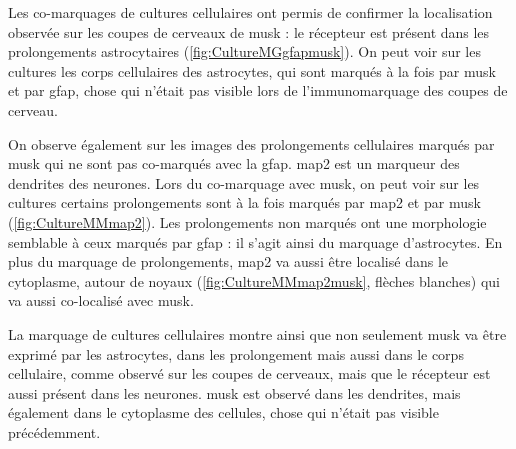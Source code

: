 	Les co-marquages de cultures cellulaires ont permis de confirmer la localisation observée sur les coupes de cerveaux de \gls{musk} : le récepteur est présent dans les prolongements astrocytaires (\cref{fig:CultureMGgfapmusk}). On peut voir sur les cultures les corps cellulaires des astrocytes, qui sont marqués à la fois par \gls{musk} et par \gls{gfap}, chose qui n'était pas visible lors de l'immunomarquage des coupes de cerveau.
	
	On observe également sur les images des prolongements cellulaires marqués par \gls{musk} qui ne sont pas co-marqués avec la \gls{gfap}. \gls{map2} est un marqueur des dendrites des neurones. Lors du co-marquage avec \gls{musk}, on peut voir sur les cultures certains prolongements sont à la fois marqués par \gls{map2} et par \gls{musk} (\cref{fig:CultureMMmap2}). Les prolongements non marqués ont une morphologie semblable à ceux marqués par \gls{gfap} : il s'agit ainsi du marquage d'astrocytes. En plus du marquage de prolongements, \gls{map2} va aussi être localisé dans le cytoplasme, autour de noyaux (\cref{fig:CultureMMmap2musk}, flèches blanches) qui va aussi co-localisé avec \gls{musk}. 
	
	La marquage de cultures cellulaires montre ainsi que non seulement \gls{musk} va être exprimé par les astrocytes, dans les prolongement mais aussi dans le corps cellulaire, comme observé sur les coupes de cerveaux, mais que le récepteur est aussi présent dans les neurones. \Gls{musk} est observé dans les dendrites, mais également dans le cytoplasme des cellules, chose qui n'était pas visible précédemment.
		
